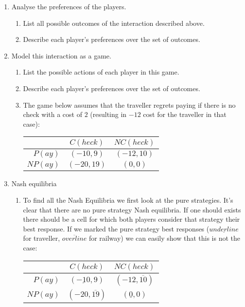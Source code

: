 \documentclass[../main.tex]{subfiles}
\begin{document}
\begin{solution}
\begin{enumerate}
	\item Analyse the preferences of the players.
	\begin{enumerate}
		\item List all possible outcomes of the interaction described above.
		\item Describe each player’s preferences over the set of outcomes.
	\end{enumerate}
	\item Model this interaction as a game.
	\begin{enumerate}
		\item List the possible actions of each player in this game.
		\item Describe each player’s preferences over the set of outcomes.
		\item The game below assumes that the traveller regrets paying if there is no check with a cost of $2$ (resulting in $-12$ cost for the traveller in that case):
			\begin{center}
				\begin{tabular}{|r|c|c|}
					\hline
					& $C(heck)$ & $NC(heck)$ \\
					\hline
					$P(ay)$ & $(-10,9)$ & $(-12,10)$ \\
					\hline
					$NP(ay)$ & $(-20,19)$ & $(0,0)$ \\
					\hline
				\end{tabular}
			\end{center}
	\end{enumerate}
	
	\item Nash equilibria
	\begin{enumerate}
		\item To find all the Nash Equilibria we first look at the pure strategies.
			It's clear that there are no pure strategy Nash equilibria. If one should exists there should be a cell for which both players consider that strategy their best response. If we marked the pure strategy best responses ($\underline{underline}$ for traveller, $\overline{overline}$ for railway) we can easily show that this is not the case:\\
		 \setlength\extrarowheight{1pt}
		 \begin{center}
			 \begin{tabular}{|r|c|c|}
				 \hline
				 & $C(heck)$ & $NC(heck)$ \\
				 \hline
				 $P(ay)$ & $(\underline{-10},9)$ & $(-12,\overline{10})$ \\ 
				 \hline
				 $NP(ay)$ & $(-20,\overline{19})$ & $(\underline{0},0)$ \\ 
				 \hline
			 \end{tabular}
		 \end{center}


\end{enumerate}
\end{enumerate}
\end{solution}
\end{document}
